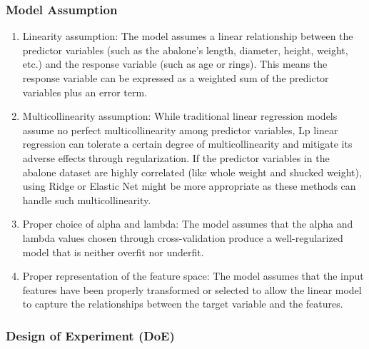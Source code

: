 \documentclass[11pt]{article} %
\begin{document}
\subsubsection{Model Assumption}
\begin{enumerate}
    \item Linearity assumption: The model assumes a linear relationship between the predictor variables (such as the abalone's length, diameter, height, weight, etc.) and the response variable (such as age or rings). This means the response variable can be expressed as a weighted sum of the predictor variables plus an error term.
    \item Multicollinearity assumption: While traditional linear regression models assume no perfect multicollinearity among predictor variables, Lp linear regression can tolerate a certain degree of multicollinearity and mitigate its adverse effects through regularization. If the predictor variables in the abalone dataset are highly correlated (like whole weight and shucked weight), using Ridge or Elastic Net might be more appropriate as these methods can handle such multicollinearity.
    \item Proper choice of alpha and lambda: The model assumes that the alpha and lambda values chosen through cross-validation produce a well-regularized model that is neither overfit nor underfit.
    \item Proper representation of the feature space: The model assumes that the input features have been properly transformed or selected to allow the linear model to capture the relationships between the target variable and the features.
\end{enumerate}
% 
% 
\subsubsection{Design of Experiment (DoE)}
\end{document}
